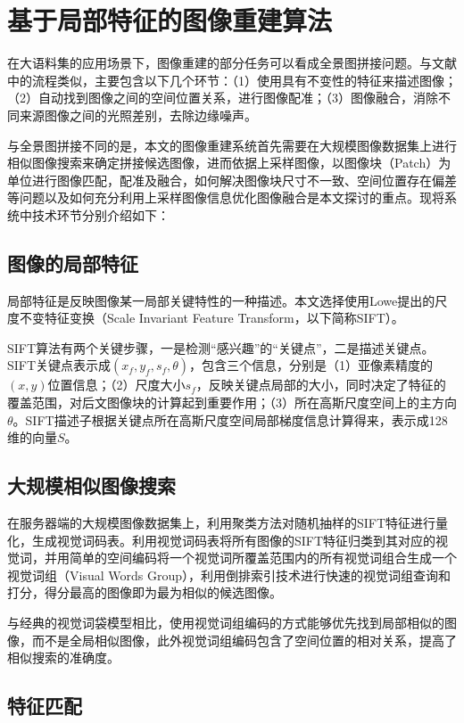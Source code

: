 \documentclass[UTF8]{csoarticle}
\begin{document}
\section{基于局部特征的图像重建算法}
在大语料集的应用场景下，图像重建的部分任务可以看成全景图拼接问题。与文献\cite{Brown:2006ir}中的流程类似，主要包含以下几个环节：（1）使用具有不变性的特征来描述图像；（2）自动找到图像之间的空间位置关系，进行图像配准；（3）图像融合，消除不同来源图像之间的光照差别，去除边缘噪声。

与全景图拼接不同的是，本文的图像重建系统首先需要在大规模图像数据集上进行相似图像搜索来确定拼接候选图像，进而依据上采样图像，以图像块（Patch）为单位进行图像匹配，配准及融合，如何解决图像块尺寸不一致、空间位置存在偏差等问题以及如何充分利用上采样图像信息优化图像融合是本文探讨的重点。现将系统中技术环节分别介绍如下：

\subsection{图像的局部特征}
局部特征是反映图像某一局部关键特性的一种描述。本文选择使用Lowe提出的尺度不变特征变换（Scale Invariant Feature Transform，以下简称SIFT）。

SIFT算法有两个关键步骤，一是检测“感兴趣”的“关键点”，二是描述关键点。SIFT关键点表示成\((x_f,y_f,s_f,\theta)\)，包含三个信息，分别是（1）亚像素精度的\((x,y)\)位置信息；（2）尺度大小\(s_f\)，反映关键点局部的大小，同时决定了特征的覆盖范围，对后文图像块的计算起到重要作用；（3）所在高斯尺度空间上的主方向\(\theta\)。SIFT描述子根据关键点所在高斯尺度空间局部梯度信息计算得来，表示成128维的向量\(S\)。

\subsection{大规模相似图像搜索}

在服务器端的大规模图像数据集上，利用聚类方法对随机抽样的SIFT特征进行量化，生成视觉词码表。利用视觉词码表将所有图像的SIFT特征归类到其对应的视觉词，并用简单的空间编码将一个视觉词所覆盖范围内的所有视觉词组合生成一个视觉词组（Visual Words Group），利用倒排索引技术进行快速的视觉词组查询和打分，得分最高的图像即为最为相似的候选图像。

与经典的视觉词袋模型相比，使用视觉词组编码的方式能够优先找到局部相似的图像，而不是全局相似图像，此外视觉词组编码包含了空间位置的相对关系，提高了相似搜索的准确度。

\subsection{特征匹配}
\end{document}
